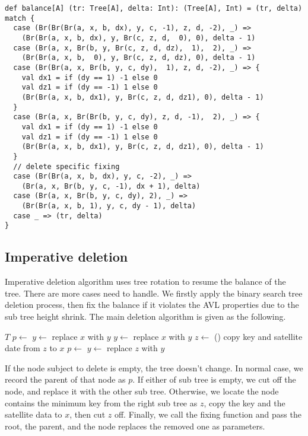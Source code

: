 \documentclass[UTF8]{article}
\begin{document}
\begin{lstlisting}
def balance[A] (tr: Tree[A], delta: Int): (Tree[A], Int) = (tr, delta) match {
  case (Br(Br(Br(a, x, b, dx), y, c, -1), z, d, -2), _) =>
    (Br(Br(a, x, b, dx), y, Br(c, z, d,  0), 0), delta - 1)
  case (Br(a, x, Br(b, y, Br(c, z, d, dz),  1),  2), _) =>
    (Br(Br(a, x, b,  0), y, Br(c, z, d, dz), 0), delta - 1)
  case (Br(Br(a, x, Br(b, y, c, dy),  1), z, d, -2), _) => {
    val dx1 = if (dy == 1) -1 else 0
    val dz1 = if (dy == -1) 1 else 0
    (Br(Br(a, x, b, dx1), y, Br(c, z, d, dz1), 0), delta - 1)
  }
  case (Br(a, x, Br(Br(b, y, c, dy), z, d, -1),  2), _) => {
    val dx1 = if (dy == 1) -1 else 0
    val dz1 = if (dy == -1) 1 else 0
    (Br(Br(a, x, b, dx1), y, Br(c, z, d, dz1), 0), delta - 1)
  }
  // delete specific fixing
  case (Br(Br(a, x, b, dx), y, c, -2), _) =>
    (Br(a, x, Br(b, y, c, -1), dx + 1), delta)
  case (Br(a, x, Br(b, y, c, dy), 2), _) =>
    (Br(Br(a, x, b, 1), y, c, dy - 1), delta)
  case _ => (tr, delta)
}
\end{lstlisting}

\subsection{Imperative deletion}

Imperative deletion algorithm uses tree rotation to resume the balance of the tree.
There are more cases need to handle. We firstly apply the binary search tree deletion
process, then fix the balance if it violates the AVL properties due to the sub tree
height shrink. The main deletion algorithm is given as the following.

\begin{algorithmic}[1]
    \State \Return $T$
  \EndIf
  \State $p \gets$ 
    \State $y \gets $ 
    \State replace $x$ with $y$
    \State $y \gets $ 
    \State replace $x$ with $y$
  \Else
    \State $z \gets$ ()
    \State copy key and satellite date from $z$ to $x$
    \State $p \gets$ 
    \State $y \gets$ 
    \State replace $z$ with $y$
  \EndIf
  \State \Return {}
\EndFunction
\end{algorithmic}

If the node subject to delete is empty, the tree doesn't change. In normal case,
we record the parent of that node as $p$. If either of sub tree is empty, we
cut off the node, and replace it with the other sub tree. Otherwise, we locate
the node contains the minimum key from the right sub tree as $z$, copy the key and the
satellite data to $x$, then cut $z$ off. Finally, we call the fixing function
and pass the root, the parent, and the node replaces the removed one as parameters.
\end{document}
